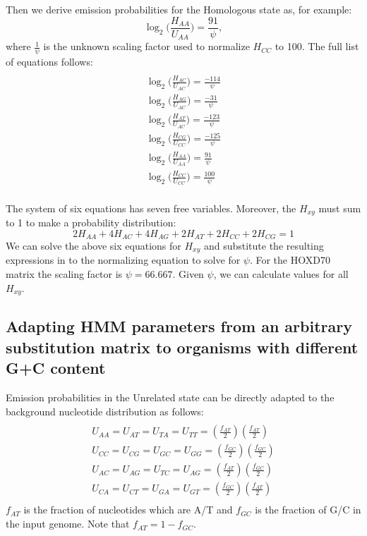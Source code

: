 Then we derive emission probabilities for
the Homologous state as, for example:
\begin{equation}
\log_{2}\bigg(\frac{H_{AA}}{U_{AA}}\bigg) = \frac{91}{\psi},
\end{equation}
where $\frac{1}{\psi}$ is the unknown scaling factor used to normalize $H_{CC}$ to 100. The full list of equations follows:
\begin{multline}\\
\log_{2}\bigg(\frac{H_{AC}}{U_{AC}}\bigg) = \frac{-114}{\psi}\\
\log_{2}\bigg(\frac{H_{AG}}{U_{AC}}\bigg) = \frac{-31}{\psi}\\
\log_{2}\bigg(\frac{H_{AT}}{U_{AC}}\bigg) = \frac{-123}{\psi}\\
\log_{2}\bigg(\frac{H_{CG}}{U_{CC}}\bigg) = \frac{-125}{\psi}\\
\log_{2}\bigg(\frac{H_{AA}}{U_{AA}}\bigg) = \frac{91}{\psi}\\
\log_{2}\bigg(\frac{H_{CC}}{U_{CC}}\bigg) = \frac{100}{\psi}\\
\end{multline}

The system of six equations has seven free variables.  Moreover, the $H_{xy}$ must sum to 1 to make a probability distribution:
\begin{equation}
2H_{AA} + 4H_{AC} + 4H_{AG} + 2H_{AT} + 2H_{CC} + 2H_{CG} = 1
\end{equation}
We can solve the above six equations for $H_{xy}$ and substitute the
resulting expressions in to the normalizing equation to solve for
$\psi$. For the HOXD70 matrix the scaling factor is $\psi=66.667$. Given
$\psi$, we can calculate values for all $H_{xy}$.


\subsection{Adapting HMM parameters from an arbitrary substitution matrix to organisms with different G+C content}
Emission
probabilities in the Unrelated state can be directly adapted to the
background nucleotide distribution as follows:
\begin{multline}\\
U_{AA}=U_{AT}=U_{TA}=U_{TT}=(\frac{f_{AT}}{2})(\frac{f_{AT}}{2})\\
U_{CC}=U_{CG}=U_{GC}=U_{GG}=(\frac{f_{GC}}{2})(\frac{f_{GC}}{2})\\
U_{AC}=U_{AG}=U_{TC}=U_{AG}=(\frac{f_{AT}}{2})(\frac{f_{GC}}{2})\\
U_{CA}=U_{CT}=U_{GA}=U_{GT}=(\frac{f_{GC}}{2})(\frac{f_{AT}}{2})\\
\end{multline}
$f_{AT}$ is the fraction of nucleotides which are A/T and
$f_{GC}$ is the fraction of G/C in the input genome.  Note that $f_{AT}=1-f_{GC}$.

